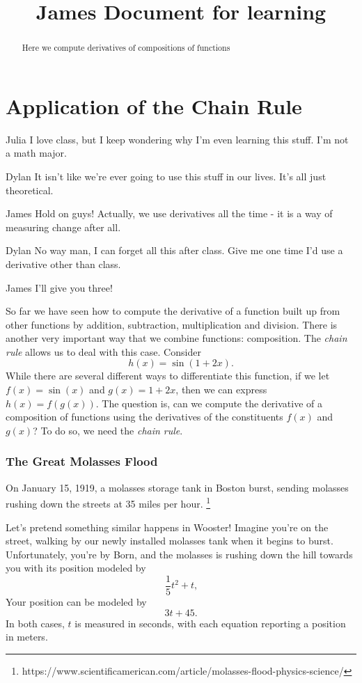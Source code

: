 \documentclass{ximera}
\begin{document}
\title{James Document for learning}
\section{Application of the Chain Rule}

\begin{dialogue}
\item[Julia] I love class, but I keep wondering why I'm even learning this stuff. I'm not a math major.
\item[Dylan] It isn't like we're ever going to use this stuff in our lives. It's all just theoretical.
\item[James] Hold on guys! Actually, we use derivatives all the time - it is a way of measuring change after all.
\item[Dylan] No way man, I can forget all this after class. Give me one time I'd use a derivative other than class.
\item[James] I'll give you three!
\end{dialogue}

\begin{abstract}
  Here we compute derivatives of compositions of functions
\end{abstract}


So far we have seen how to compute the derivative of a function built
up from other functions by addition, subtraction, multiplication and
division. There is another very important way that we combine
functions: composition. The \textit{chain rule} allows us to deal with
this case. Consider
\[
h(x) = \sin(1+2x).
\] 
While there are several different ways to differentiate this function,
if we let $f(x) = \sin(x)$ and $g(x) = 1+2x$, then we can express
$h(x) = f(g(x))$. The question is, can we compute the derivative of a
composition of functions using the derivatives of the constituents
$f(x)$ and $g(x)$? To do so, we need the \textit{chain rule}.


\subsubsection{The Great Molasses Flood}
On January 15, 1919, a molasses storage tank in Boston burst, sending molasses rushing down the streets at 35 miles per hour. \footnote{https://www.scientificamerican.com/article/molasses-flood-physics-science/}

Let's pretend something similar happens in Wooster! Imagine you're on the street, walking by our newly installed molasses tank when it begins to burst. Unfortunately, you're by Born, and the molasses is rushing down the hill towards you with its position modeled by $$\frac{1}{5}t^2+t \text{,}$$ Your position can be modeled by $$3t+45 \text{.}$$ In both cases, $t$ is measured in seconds, with each equation reporting a position in meters.
\end{document}
